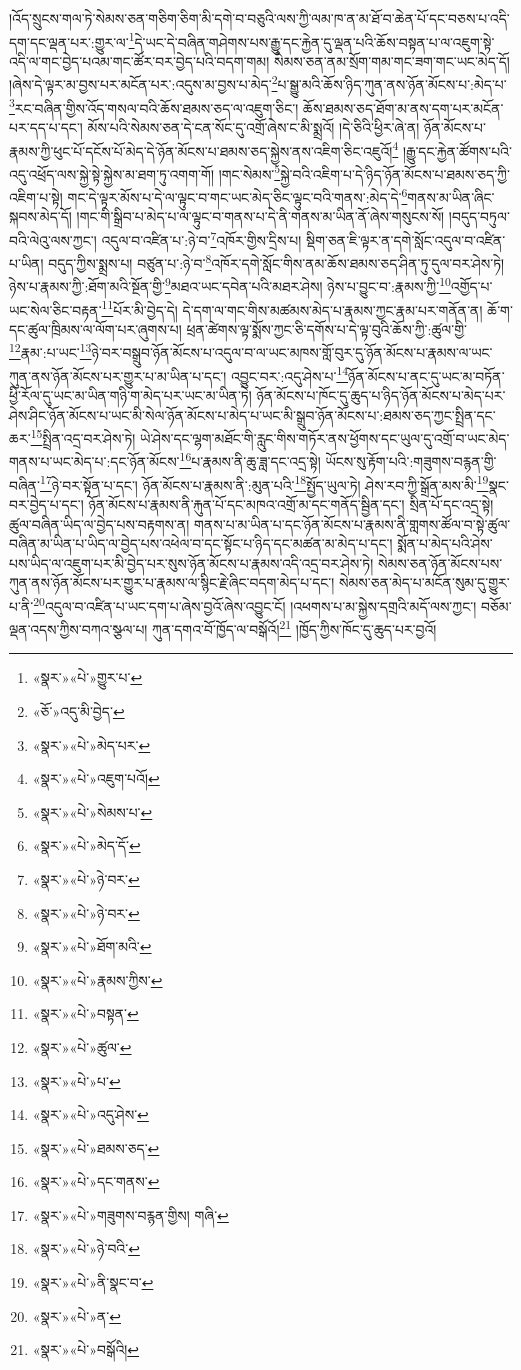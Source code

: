 །འོད་སྲུངས་གལ་ཏེ་སེམས་ཅན་གཅིག་ཅིག་མི་དགེ་བ་བཅུའི་ལས་ཀྱི་ལམ་ཁ་ན་མ་ཐོ་བ་ཆེན་པོ་དང་བཅས་པ་འདི་དག་དང་ལྡན་པར་:གྱུར་ལ་\footnote{«སྣར་»«པེ་»གྱུར་པ་}དེ་ཡང་དེ་བཞིན་གཤེགས་པས་རྒྱུ་དང་རྐྱེན་དུ་ལྡན་པའི་ཆོས་བསྟན་པ་ལ་འཇུག་སྟེ་འདི་ལ་གང་བྱེད་པའམ་གང་ཚོར་བར་བྱེད་པའི་བདག་གམ། སེམས་ཅན་ནམ་སྲོག་གམ་གང་ཟག་གང་ཡང་མེད་དོ། །ཞེས་དེ་ལྟར་མ་བྱས་པར་མངོན་པར་:འདུས་མ་བྱས་པ་མེད་\footnote{«ཅོ་»འདུ་མི་བྱེད་}པ་སྒྱུ་མའི་ཆོས་ཉིད་ཀུན་ནས་ཉོན་མོངས་པ་:མེད་པ་\footnote{«སྣར་»«པེ་»མེད་པར་}རང་བཞིན་གྱིས་འོད་གསལ་བའི་ཆོས་ཐམས་ཅད་ལ་འཇུག་ཅིང་། ཆོས་ཐམས་ཅད་ཐོག་མ་ནས་དག་པར་མངོན་པར་དད་པ་དང་། མོས་པའི་སེམས་ཅན་དེ་ངན་སོང་དུ་འགྲོ་ཞེས་ང་མི་སྨྲའོ། །དེ་ཅིའི་ཕྱིར་ཞེ་ན། ཉོན་མོངས་པ་རྣམས་ཀྱི་ཕུང་པོ་དངོས་པོ་མེད་དེ་ཉོན་མོངས་པ་ཐམས་ཅད་སྐྱེས་ནས་འཇིག་ཅིང་འཇུའོ།\footnote{«སྣར་»«པེ་»འཇུག་པའོ།} །རྒྱུ་དང་རྐྱེན་ཚོགས་པའི་འདུ་འཕྲོད་ལས་སྐྱེ་སྟེ་སྐྱེས་མ་ཐག་ཏུ་འགག་གོ། །གང་སེམས་\footnote{«སྣར་»«པེ་»སེམས་པ་}སྐྱེ་བའི་འཇིག་པ་དེ་ཉིད་ཉོན་མོངས་པ་ཐམས་ཅད་ཀྱི་འཇིག་པ་སྟེ། གང་དེ་ལྟར་མོས་པ་དེ་ལ་ལྟུང་བ་གང་ཡང་མེད་ཅིང་ལྟུང་བའི་གནས་:མེད་དེ་\footnote{«སྣར་»«པེ་»མེད་དོ་}གནས་མ་ཡིན་ཞིང་སྐབས་མེད་དོ། །གང་གི་སྒྲིབ་པ་མེད་པ་ལ་ལྟུང་བ་གནས་པ་དེ་ནི་གནས་མ་ཡིན་ནོ་ཞེས་གསུངས་སོ། །བདུད་བཏུལ་བའི་ལེའུ་ལས་ཀྱང་། འདུལ་བ་འཛིན་པ་:ཉེ་བ་\footnote{«སྣར་»«པེ་»ཉེ་བར་}འཁོར་གྱིས་དྲིས་པ། སྡིག་ཅན་ཇི་ལྟར་ན་དགེ་སློང་འདུལ་བ་འཛིན་པ་ཡིན། བདུད་ཀྱིས་སྨྲས་པ། བཙུན་པ་:ཉེ་བ་\footnote{«སྣར་»«པེ་»ཉེ་བར་}འཁོར་དགེ་སློང་གིས་ནམ་ཆོས་ཐམས་ཅད་ཤིན་ཏུ་དུལ་བར་ཤེས་ཏེ། ཉེས་པ་རྣམས་ཀྱི་:ཐོག་མའི་སྔོན་གྱི་\footnote{«སྣར་»«པེ་»ཐོག་མའི་}མཐའ་ཡང་དབེན་པའི་མཐར་ཤེས། ཉེས་པ་བྱུང་བ་:རྣམས་ཀྱི་\footnote{«སྣར་»«པེ་»རྣམས་ཀྱིས་}འགྱོད་པ་ཡང་སེལ་ཅིང་བརྟན་\footnote{«སྣར་»«པེ་»བསྟན་}པོར་མི་བྱེད་དེ། དེ་དག་ལ་གང་གིས་མཚམས་མེད་པ་རྣམས་ཀྱང་རྣམ་པར་གནོན་ན། ཆོ་ག་དང་ཚུལ་ཁྲིམས་ལ་ལོག་པར་ཞུགས་པ། ཕྲན་ཚེགས་ལྟ་སྨོས་ཀྱང་ཅི་དགོས་པ་དེ་ལྟ་བུའི་ཆོས་ཀྱི་:ཚུལ་གྱི་\footnote{«སྣར་»«པེ་»ཚུལ་}རྣམ་:པ་ཡང་\footnote{«སྣར་»«པེ་»པ་}ཉེ་བར་བསྒྲུབ་ཉོན་མོངས་པ་འདུལ་བ་ལ་ཡང་མཁས་གློ་བུར་དུ་ཉོན་མོངས་པ་རྣམས་ལ་ཡང་ཀུན་ནས་ཉོན་མོངས་པར་གྱུར་པ་མ་ཡིན་པ་དང་། འབྱུང་བར་:འདུ་ཤེས་པ་\footnote{«སྣར་»«པེ་»འདུ་ཤེས་}ཉོན་མོངས་པ་ནང་དུ་ཡང་མ་བཏོན་ཕྱི་རོལ་དུ་ཡང་མ་ཡིན་གཉི་ག་མེད་པར་ཡང་མ་ཡིན་ཏེ། ཉོན་མོངས་པ་ཁོང་དུ་ཆུད་པ་ཉིད་ཉོན་མོངས་པ་མེད་པར་ཤེས་ཤིང་ཉོན་མོངས་པ་ཡང་མི་སེལ་ཉོན་མོངས་པ་མེད་པ་ཡང་མི་སྒྲུབ་ཉོན་མོངས་པ་:ཐམས་ཅད་ཀྱང་སྤྲིན་དང་ཆར་\footnote{«སྣར་»«པེ་»ཐམས་ཅད་}སྤྲིན་འདྲ་བར་ཤེས་ཏེ། ཡེ་ཤེས་དང་ལྷག་མཐོང་གི་རླུང་གིས་གཏོར་ནས་ཕྱོགས་དང་ཡུལ་དུ་འགྲོ་བ་ཡང་མེད་གནས་པ་ཡང་མེད་པ་:དང་ཉོན་མོངས་\footnote{«སྣར་»«པེ་»དང་གནས་}པ་རྣམས་ནི་ཆུ་ཟླ་དང་འདྲ་སྟེ། ཡོངས་སུ་རྟོག་པའི་:གཟུགས་བརྙན་གྱི་བཞིན་\footnote{«སྣར་»«པེ་»གཟུགས་བརྙན་གྱིས། གཞི་}ཉེ་བར་སྟོན་པ་དང་། ཉོན་མོངས་པ་རྣམས་ནི་:མུན་པའི་\footnote{«སྣར་»«པེ་»ཉེ་བའི་}སྤྱོད་ཡུལ་ཏེ། ཤེས་རབ་ཀྱི་སྒྲོན་མས་མི་\footnote{«སྣར་»«པེ་»ནི་སྣང་བ་}སྣང་བར་བྱེད་པ་དང་། ཉོན་མོངས་པ་རྣམས་ནི་རྐུན་པོ་དང་མཁའ་འགྲོ་མ་དང་གནོད་སྦྱིན་དང་། སྲིན་པོ་དང་འདྲ་སྟེ། ཚུལ་བཞིན་ཡིད་ལ་བྱེད་པས་བརྟགས་ན། གནས་པ་མ་ཡིན་པ་དང་ཉོན་མོངས་པ་རྣམས་ནི་གླགས་ཚོལ་བ་སྟེ་ཚུལ་བཞིན་མ་ཡིན་པ་ཡིད་ལ་བྱེད་པས་འཕེལ་བ་དང་སྟོང་པ་ཉིད་དང་མཚན་མ་མེད་པ་དང་། སྨོན་པ་མེད་པའི་ཤེས་པས་ཡིད་ལ་འཇུག་པར་མི་བྱེད་པར་སུས་ཉོན་མོངས་པ་རྣམས་འདི་འདྲ་བར་ཤེས་ཏེ། སེམས་ཅན་ཉོན་མོངས་པས་ཀུན་ནས་ཉོན་མོངས་པར་གྱུར་པ་རྣམས་ལ་སྙིང་རྗེ་ཞིང་བདག་མེད་པ་དང་། སེམས་ཅན་མེད་པ་མངོན་སུམ་དུ་གྱུར་པ་ནི་\footnote{«སྣར་»«པེ་»ན་}འདུལ་བ་འཛིན་པ་ཡང་དག་པ་ཞེས་བྱའོ་ཞེས་འབྱུང་ངོ། །འཕགས་པ་མ་སྐྱེས་དགྲའི་མདོ་ལས་ཀྱང་། བཅོམ་ལྡན་འདས་ཀྱིས་བཀའ་སྩལ་པ། ཀུན་དགའ་བོ་ཁྱོད་ལ་བསྒོའོ།\footnote{«སྣར་»«པེ་»བསྒོའི།} །ཁྱོད་ཀྱིས་ཁོང་དུ་ཆུད་པར་བྱའོ། 